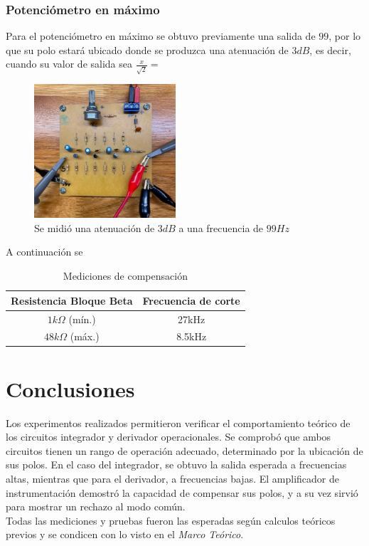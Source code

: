 \documentclass[letterpaper, 10 pt, conference]{ieeeconf}  %
\begin{document}
\subsubsection{Potenciómetro en máximo}
Para el potenciómetro en máximo se obtuvo previamente una salida de $99$, por lo que su polo estará ubicado donde se produzca una atenuación de $3dB$, es decir, cuando su valor de salida sea $\frac{x}{\sqrt{2}} = $

\begin{figure}[H]
  \centering
  \includegraphics[width=0.47\textwidth]{imagenes/placa conectada.jpg}
  \caption{Se midió una atenuación de $3dB$ a una frecuencia de $99Hz$}
  \label{fig:osciloscopio_freq_pote_max}
\end{figure}

A continuación se 

\begin{table}[h]
\begin{center}
\begin{tabular}{|c||c|}
\hline
Resistencia Bloque Beta & Frecuencia de corte\\
\hline
$1k\Omega$ (mín.) & 27kHz\\
\hline
$48k\Omega$ (máx.) & 8.5kHz\\
\hline
\end{tabular}
\end{center}
\caption{Mediciones de compensación}
\label{tab:simple}
\end{table}

\section{Conclusiones}

Los experimentos realizados permitieron verificar el comportamiento teórico de los circuitos integrador y derivador operacionales. Se comprobó que ambos circuitos tienen un rango de operación adecuado, determinado por la ubicación de sus polos. En el caso del integrador, se obtuvo la salida esperada a frecuencias altas, mientras que para el derivador, a frecuencias bajas. El amplificador de instrumentación demostró la capacidad de compensar sus polos, y a su vez sirvió para mostrar un rechazo al modo común.\\
Todas las mediciones y pruebas fueron las esperadas según calculos teóricos previos y se condicen con lo visto en el \textit{Marco Teórico}.
 
\end{document}
